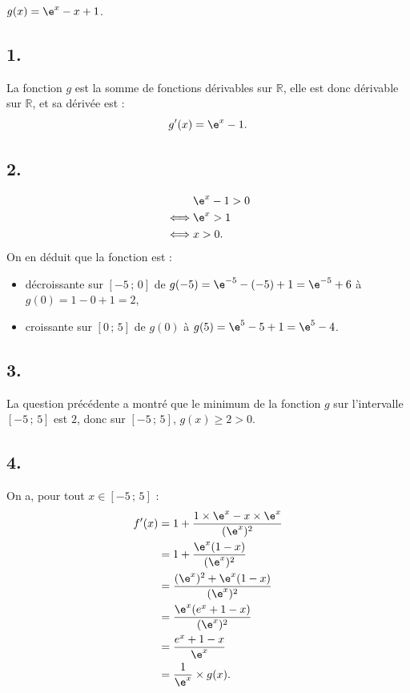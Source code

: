 \(g(x) = \e^x - x + 1\).

\subsection*{1.}

La fonction \(g\) est la somme de fonctions dérivables sur \(\mathbb{R}\), elle est donc dérivable sur \(\mathbb{R}\), et sa dérivée est :
\[
g'(x) = \e^x - 1.
\]

\subsection*{2.}

\begin{align*}
&\e^x - 1 > 0 \\
\iff &\e^x > 1 \\
\iff &x > 0.
\end{align*}
On en déduit que la fonction est :
\begin{itemize}[label=-]
    \item décroissante sur \([-5\,;\,0]\) de \(g(-5) = \e^{-5} - (-5) + 1 = \e^{-5} + 6\) à \(g(0) = 1 - 0 + 1 = 2\),
    \item croissante sur \([0\,;\,5]\) de \(g(0)\) à \(g(5) = \e^{5} - 5 + 1 = \e^{5} - 4\).
\end{itemize}

\subsection*{3.}

La question précédente a montré que le minimum de la fonction \(g\) sur l'intervalle \([-5\,;\,5]\) est \(2\), donc sur \([-5\,;\,5]\), \(g(x) \geqslant 2 > 0\).

\subsection*{4.}

On a, pour tout \(x \in [-5\,;\,5]\) :
\begin{align*}
f'(x) &= 1 + \dfrac{1 \times \e^x - x \times \e^x}{(\e^x)^2} \\
&= 1 + \dfrac{\e^x(1 - x)}{(\e^x)^2} \\
&= \dfrac{(\e^x)^2 + \e^x(1 - x)}{(\e^x)^2} \\
&= \dfrac{\e^x(e^x + 1 - x)}{(\e^x)^2} \\
&= \dfrac{e^x + 1 - x}{\e^x} \\
&= \dfrac{1}{\e^x} \times g(x).
\end{align*}

